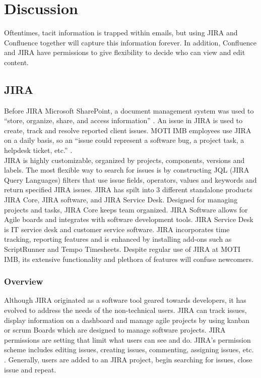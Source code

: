 	
\section{Discussion}
 Oftentimes, tacit information is trapped within emails, but using \gls{JIRA} and \gls{Confluence} together will capture this information forever. In addition, \gls{Confluence} and \gls{JIRA} have permissions to give flexibility to decide who can view and edit content.
 \subsection{JIRA}
Before JIRA Microsoft SharePoint, a document management system was used to “store, organize, share, and access information” \cite{sharepoint:Online}. An issue in JIRA is used to create, track and resolve reported client issues. MOTI IMB employees use JIRA on a daily basis, so an “issue could represent a software bug, a project task, a helpdesk ticket, etc.” \cite{issueDefinition:Online}.  \\

 JIRA is highly customizable, organized by projects, components, versions and labels. The most flexible way to search for issues is by constructing JQL (JIRA Query Languages) filters that use issue fields, operators, values and keywords and return specified JIRA issues. JIRA has spilt into 3 different standalone products JIRA Core, JIRA software, and JIRA Service Desk. Designed for managing projects and tasks, JIRA Core keeps team organized. JIRA Software allows for Agile boards and integrates with software development tools.  JIRA Service Desk is IT service desk and customer service software. JIRA incorporates time tracking, reporting features and is enhanced by installing add-ons such as ScriptRunner and Tempo Timesheets. Despite regular use of JIRA at MOTI IMB, its extensive functionality and plethora of features will confuse newcomers. 
 
 \subsubsection{Overview}
 Although JIRA originated as a software tool geared towards developers, it has evolved to address the needs of the non-technical users. \gls{JIRA} can track issues, display information on a dashboard and manage \gls{agile} projects by using \gls{kanban} or \gls{scrum} Boards which are designed to manage software projects. JIRA permissions are setting that limit what users can see and do. JIRA’s permission scheme includes editing issues, creating issues, commenting, assigning issues, etc. \cite{PermissionsOverview:Online}. Generally, users are added to an JIRA project, begin searching for issues, close \gls{issue} and repeat. 

